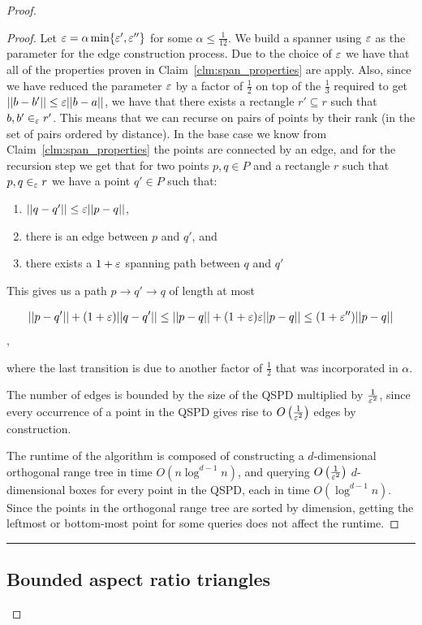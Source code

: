 \documentclass[12pt]{article}%
\begin{document}
\begin{proof}
\begin{proof} 
	Let $\varepsilon = \alpha \min \{\varepsilon',\varepsilon''\}$ for some $\alpha \leq \frac{1}{12}$. We build a spanner using $\varepsilon$ as the parameter for the edge construction process. Due to the choice of $\varepsilon$ we have that all of the properties proven in Claim~\ref{clm:span_properties} are apply. Also, since we have reduced the parameter $\varepsilon$ by a factor of $\frac{1}{2}$ on top of the $\frac{1}{3}$ required to get $||b-b'||\leq \varepsilon ||b-a||$, we have that there exists a rectangle $r'\subseteq r$ such that $b,b'\in_{\varepsilon}r'$. This means that we can recurse on pairs of points by their rank (in the set of pairs ordered by distance). In the base case we know from Claim~\ref{clm:span_properties} the points are connected by an edge, and for the recursion step we get that for two points $p,q\in P$ and a rectangle $r$ such that $p,q\in_{\varepsilon} r$ we have a point $q'\in P$ such that:
	\begin{enumerate}
		\item $||q-q'||\leq \varepsilon||p-q||$,
		\item there is an edge between $p$ and $q'$, and
		\item there exists a $1+\varepsilon$ spanning path between $q$ and $q'$
	\end{enumerate}

	This gives us a path $p\rightarrow q' \rightarrow q$ of length at most
	
	$$||p-q'||+(1+\varepsilon)||q-q'||\leq ||p-q||+(1+\varepsilon)\varepsilon||p-q||\leq (1+\varepsilon'')||p-q||$$,
	
	where the last transition is due to another factor of $\frac{1}{2}$ that was incorporated in $\alpha$. 
	
	The number of edges is bounded by the size of the QSPD multiplied by $\frac{1}{\varepsilon^2}$, since every occurrence of a point in the QSPD gives rise to $O\left(\frac{1}{\varepsilon^2}\right)$ edges by construction.
	
	The runtime of the algorithm is composed of constructing a $d$-dimensional orthogonal range tree in time $O(n\log^{d-1}n)$, and querying $O\left(\frac{1}{\varepsilon^2}\right)$ $d$-dimensional boxes for every point in the QSPD, each in time $O(\log^{d-1}n)$. Since the points in the orthogonal range tree are sorted by dimension, getting the leftmost or bottom-most point for some queries does not affect the runtime.
	
\end{proof}
\hrule


\subsection{Bounded aspect ratio triangles}


\end{proof}
\end{document}
